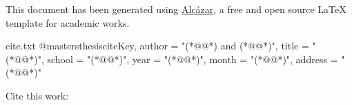     \noindent This document has been generated using {\href{https://github.com/dpmj/alcazar}{Alcázar}}, a free and open source {\LaTeX} template for academic works.

\endgroup





\begin{verbatimwrite}{cite.txt}
@mastersthesis{citeKey,
    author  = "(*@{\thesisAuthor}@*) and (*@{\thesisTutor}@*)",
    title   = "(*@{\thesisTitle}@*)",
    school  = "(*@{\thesisSchool}@*)",
    year    = "(*@{\thesisYear}@*)",
    month   = "(*@{\thesisMonth}@*)",
    address = "(*@{\thesisAddress}@*)"
}
\end{verbatimwrite}


\begingroup

\vspace*{5mm}

\small
\setlength\tabcolsep{0pt}
\renewcommand*{\arraystretch}{1.2}
{\noindent\large  Cite this work:}

\begin{mdframed}[backgroundcolor=listing-background,hidealllines=true]
\vspace*{2mm}

\end{mdframed}


\endgroup
